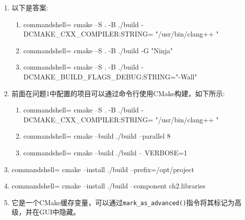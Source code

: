 

\begin{enumerate}
\item 
以下是答案:
\begin{enumerate}[label=\Alph*]
\item 

\begin{tcblisting}{commandshell={}}
cmake –S . -B ./build -DCMAKE_CXX_COMPILER:STRING=
"/usr/bin/clang++ "
\end{tcblisting}

\item

\begin{tcblisting}{commandshell={}}
cmake –S . -B ./build -G "Ninja"
\end{tcblisting}

\item 

\begin{tcblisting}{commandshell={}}
cmake –S . -B ./build 
-DCMAKE_BUILD_FLAGS_DEBUG:STRING="-Wall"
\end{tcblisting}
\end{enumerate}

\item 
前面在问题1中配置的项目可以通过命令行使用CMake构建，如下所示:

\begin{enumerate}[label=\Alph*]
\item 
\begin{tcblisting}{commandshell={}}
cmake –S . -B ./build 
-DCMAKE_CXX_COMPILER:STRING= "/usr/bin/clang++ "
\end{tcblisting}

\item

\begin{tcblisting}{commandshell={}}
cmake --build ./build --parallel 8
\end{tcblisting}

\item 

\begin{tcblisting}{commandshell={}}
cmake --build ./build -- VERBOSE=1
\end{tcblisting}
\end{enumerate}

\item 
\begin{tcblisting}{commandshell={}}
cmake --install ./build --prefix=/opt/project
\end{tcblisting}

\item 
\begin{tcblisting}{commandshell={}}
cmake --install ./build --component ch2.libraries
\end{tcblisting}

\item 
它是一个CMake缓存变量，可以通过\texttt{mark\_as\_advanced()}指令将其标记为高级，并在GUI中隐藏。
\end{enumerate}